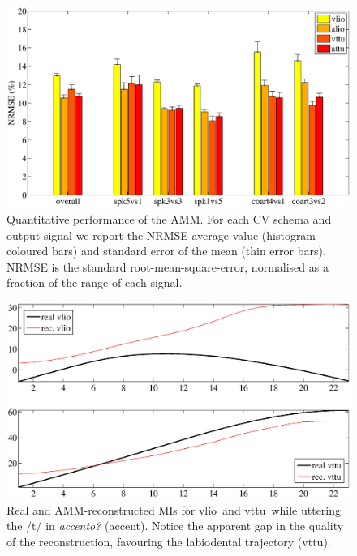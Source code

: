 \documentclass{pnastwo}
\newcommand{\vlio}{\textsf{vlio}}
\newcommand{\vttu}{\textsf{vttu}}
\begin{document}
\begin{figure}[t]
  \centerline{\includegraphics[width=\textwidth]{figs/figAMM}}
  \caption{Quantitative performance of the AMM. For each CV schema and output signal
    we report the NRMSE average value (histogram coloured bars) and standard error of
    the mean (thin error bars). NRMSE is the standard root-mean-square-error, normalised
    as a fraction of the range of each signal.}
  \label{fig:amm_perf}
\end{figure}

\begin{figure}[t]
  \centerline{\includegraphics[width=\textwidth]{figs/figAccento_}}
  \caption{Real and AMM-reconstructed MIs for \vlio\ and \vttu\ while uttering
    the /t/ in \emph{accento?} (accent). Notice the apparent gap in the quality
    of the reconstruction, favouring the labiodental trajectory (\vttu).}
  \label{fig:example}
\end{figure}
\end{document}
